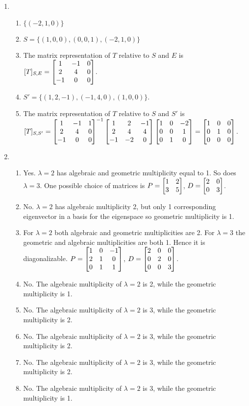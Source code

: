{\begin{multicols}{2}
\begin{enumerate}
\item 
\begin{enumerate}
	\item $\{(-2,1,0)\}$
	\item $S=\{(1,0,0),(0,0,1),(-2,1,0)\}$
	\item The matrix representation of $T$ relative to $S$ and $E$ is $[T]_{S,E} = \begin{bmatrix}  1 & -1 & 0 \\
 2 & 4 & 0 \\
 -1 & 0 & 0 \end{bmatrix}
$.
	\item $S' = \{(1,2,-1),(-1,4,0),(1,0,0)\}$.
	\item The matrix representation of $T$ relative to $S$ and $S'$ is $[T]_{S,S'} =  
	\begin{bmatrix}  
	1 & -1 & 1 \\
 2 & 4 & 0 \\
 -1 & 0 & 0 \end{bmatrix}^{-1}
 \begin{bmatrix}  
	1 & 2 & -1 \\
 2 & 4 & 4 \\
 -1 & -2 & 0 \end{bmatrix}
	\begin{bmatrix}  
	1 & 0 & -2 \\
 0 & 0 & 1 \\
 0 & 1 & 0 \end{bmatrix}
=
	\begin{bmatrix}  1 & 0 & 0 \\
 0 & 1 & 0 \\
 0 & 0 & 0 \end{bmatrix}
$.
\end{enumerate}

\item 
\begin{enumerate}
	\item Yes. $\lambda =2$ has algebraic and geometric multiplicity equal to 1.  So does $\lambda=3$.  One possible choice of matrices is
	$P = \begin{bmatrix}  
 1 & 2 \\
 3 & 5
 	 \end{bmatrix}$, 
	$D = \begin{bmatrix}  
 2 & 0 \\
 0 & 3
 	 \end{bmatrix}$. 
	\item 
No.  $\lambda = 2$ has algebraic multiplicity 2, but only 1 corresponding eigenvector in a basis for the eigenspace so geometric multiplicity is 1.
	\item For $\lambda =2$ both algebraic and geometric multiplicities are 2.  For $\lambda = 3$ the geometric and algebraic multiplicities are both 1.  Hence it is diagonalizable.  
	$P = \begin{bmatrix}  
 1 & 0 & -1 \\
 2 & 1 & 0 \\
 0 & 1 & 1
 	 \end{bmatrix}$, 
	$D = \begin{bmatrix}  
 2 & 0 & 0 \\
 0 & 2 & 0 \\
 0 & 0 & 3
 	 \end{bmatrix}$. 
	\item 
No.  The algebraic multiplicity of $\lambda =2 $ is 2, while the geometric multiplicity is 1.
	\item 
No.  The algebraic multiplicity of $\lambda =2 $ is 3, while the geometric multiplicity is 2.
	\item 
No.  The algebraic multiplicity of $\lambda =2 $ is 3, while the geometric multiplicity is 2.
	\item 
No.  The algebraic multiplicity of $\lambda =2 $ is 3, while the geometric multiplicity is 2.
	\item 
No.  The algebraic multiplicity of $\lambda =2 $ is 3, while the geometric multiplicity is 1. 
\end{enumerate}




\end{enumerate}
\end{multicols}}
